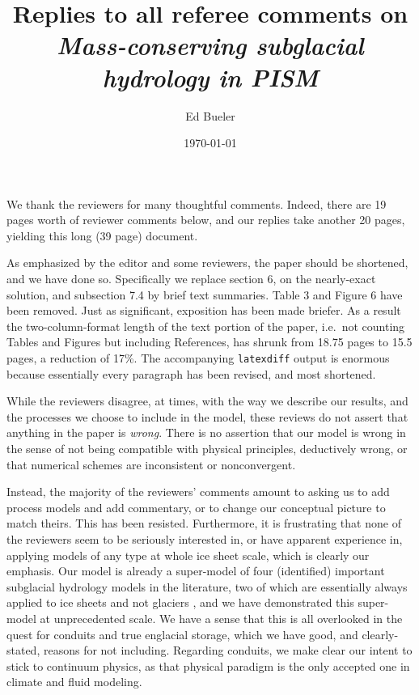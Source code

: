 \documentclass[11pt,reqno]{amsart}
\title[Replies to Referee Comments]{Replies to all referee comments on \\ \emph{Mass-conserving subglacial hydrology in PISM}}
\author{Ed Bueler}
\date{\today}
\begin{document}
\maketitle

\thispagestyle{empty}

We thank the reviewers for many thoughtful comments.  Indeed, there are 19 pages worth of reviewer comments below, and our replies take another 20 pages, yielding this long (39 page) document.

As emphasized by the editor and some reviewers, the paper should be shortened, and we have done so.  Specifically we replace section 6, on the nearly-exact solution, and subsection 7.4 by brief text summaries.  Table 3 and Figure 6 have been removed.  Just as significant, exposition has been made briefer.  As a result the two-column-format length of the text portion of the paper, i.e.~not counting Tables and Figures but including References, has shrunk from 18.75 pages to 15.5 pages, a reduction of 17\%.  The accompanying \texttt{latexdiff} output is enormous because essentially every paragraph has been revised, and most shortened.

While the reviewers disagree, at times, with the way we describe our results, and the processes we choose to include in the model, these reviews do not assert that anything in the paper is \emph{wrong}.  There is no assertion that our model is wrong in the sense of not being compatible with physical principles, deductively wrong, or that numerical schemes are inconsistent or nonconvergent.

Instead, the majority of the reviewers' comments amount to asking us to add process models and add commentary, or to change our conceptual picture to match theirs.  This has been resisted.  Furthermore, it is frustrating that none of the reviewers seem to be seriously interested in, or have apparent experience in, applying models of any type at whole ice sheet scale, which is clearly our emphasis.  Our model is already a super-model of four (identified) important subglacial hydrology models in the literature, two of which are essentially always applied to ice sheets and not glaciers \cite{Siegertetal2009,Tulaczyketal2000}, and we have demonstrated this super-model at unprecedented scale.  We have a sense that this is all overlooked in the quest for conduits and true englacial storage, which we have good, and clearly-stated, reasons for not including.  Regarding conduits, we make clear our intent to stick to continuum physics, as that physical paradigm is the only accepted one in climate and fluid modeling.
\end{document}
